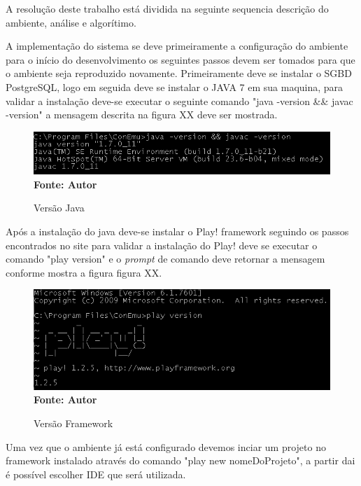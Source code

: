 

\iniciocapitulo
A resolução deste trabalho está dividida na seguinte sequencia descrição do ambiente, análise e algorítimo.\par

A implementação do sistema se deve primeiramente a configuração do ambiente para o início do desenvolvimento os seguintes passos devem ser tomados para que o ambiente seja reproduzido novamente. Primeiramente deve se instalar o SGBD PostgreSQL, logo em seguida deve se instalar o JAVA 7 em sua maquina, para validar a instalação deve-se executar o seguinte comando "java -version && javac -version" a mensagem descrita na figura XX deve ser mostrada.

\begin{figure}[!htb]
\caption[Versão Java]{Versão Java}
\label{fig:figura2}
\centering
\includegraphics[scale=0.8]{imagens/mensagemJava.png}
\\ \textbf{\footnotesize Fonte: Autor}
\end{figure}


Após a instalação do java deve-se instalar o Play! framework seguindo os passos encontrados no site \cite{play} para validar a instalação do Play! deve se executar o comando "play version" e o \textit{prompt} de comando deve retornar a mensagem conforme mostra a figura figura XX.

\begin{figure}[!htb]
\caption[Versão Framework]{Versão Framework}
\label{fig:figura2}
\centering
\includegraphics[scale=0.8]{imagens/mensagemPlay.png}
\\ \textbf{\footnotesize Fonte: Autor}
\end{figure}

Uma vez que o ambiente já está configurado devemos inciar um projeto no framework instalado através do comando "play new nomeDoProjeto", a partir dai é possível escolher IDE que será utilizada.


